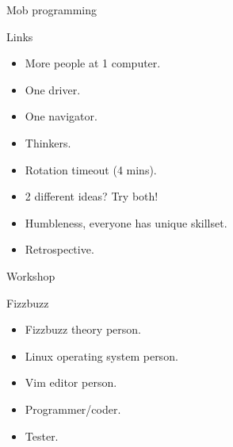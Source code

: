 
\begin{frame}{Mob programming}
  \begin{block}{Links}
    \begin{itemize}
      \item More people at 1 computer. 
      \item One driver. 
      \item One navigator.
      \item Thinkers.
      \item Rotation timeout (4 mins). 
      \item 2 different ideas? Try both!
      \item Humbleness, everyone has unique skillset. 
      \item Retrospective.
    \end{itemize}
  \end{block}
\end{frame}

\begin{frame}{Workshop}
  \begin{block}{Fizzbuzz}
    \begin{itemize}
      \item Fizzbuzz theory person.
      \item Linux operating system person.
      \item Vim editor person.
      \item Programmer/coder. 
      \item Tester. 
    \end{itemize}
  \end{block}
\end{frame}


